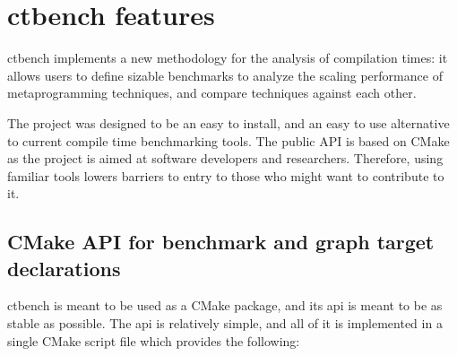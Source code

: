 \documentclass[../main]{subfiles}
\begin{document}
\section{
  ctbench features
}

ctbench implements a new methodology for the analysis of compilation times:
it allows users to define \cpp sizable benchmarks to analyze the scaling
performance of \cpp metaprogramming techniques, and compare techniques
against each other.

The project was designed to be an easy to install,
and an easy to use alternative to current compile time benchmarking tools.
The public API is based on CMake as the project is aimed at \cpp software
developers and researchers. Therefore, using familiar tools
lowers barriers to entry to those who might want to contribute to it.

\subsection{
  CMake API for benchmark and graph target declarations
}
\label{lbl:ctbench-cmake-api}

ctbench is meant to be used as a CMake package, and its \gls{api} is meant to be
as stable as possible. The \gls{api} is relatively simple, and all of it is
implemented in a single CMake script file which provides the following:
\end{document}
